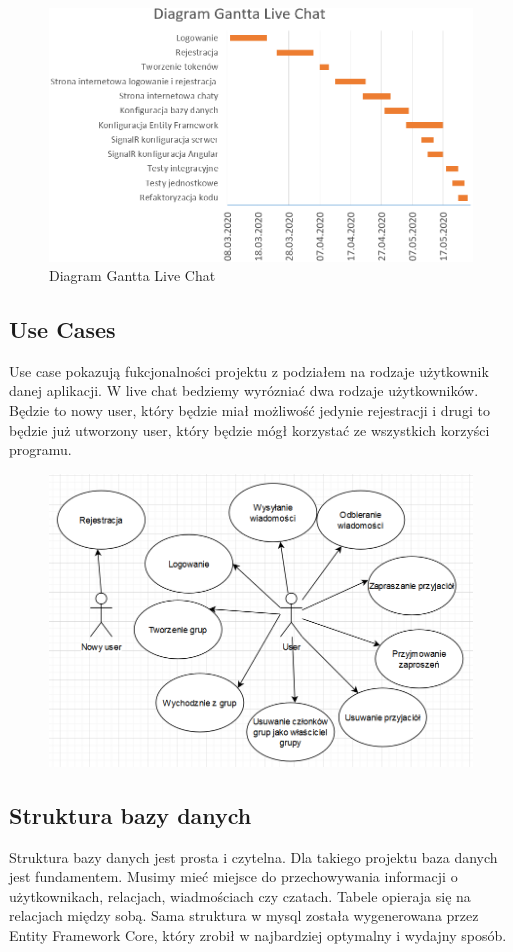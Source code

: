 \documentclass[12pt,a4paper]{article}
\begin{document}
\begin{figure}[h]
	\centering
	\includegraphics[width=0.8\linewidth]{diagramGantta}
	\caption{Diagram Gantta Live Chat}
	\label{fig:diagramgantta}
\end{figure}

\subsection{Use Cases}					%
Use case pokazują fukcjonalności projektu z podziałem na rodzaje użytkownik danej aplikacji. W live chat bedziemy wyrózniać dwa rodzaje użytkowników. Będzie to nowy user, który będzie miał możliwość jedynie rejestracji i drugi to będzie już utworzony user, który będzie mógł korzystać ze wszystkich korzyści programu.

\begin{figure}[h]
	\centering
	\includegraphics[width=0.7\linewidth]{usecase}
	\caption{}
	\label{fig:usecase}
\end{figure}

\subsection{Struktura bazy danych}  	%
Struktura bazy danych jest prosta i czytelna. Dla takiego projektu baza danych jest fundamentem. Musimy mieć miejsce do przechowywania informacji o użytkownikach, relacjach, wiadmościach czy czatach. Tabele opieraja się na relacjach między sobą. Sama struktura w mysql została wygenerowana przez Entity Framework Core, który zrobił w najbardziej optymalny i wydajny sposób.
\end{document}
